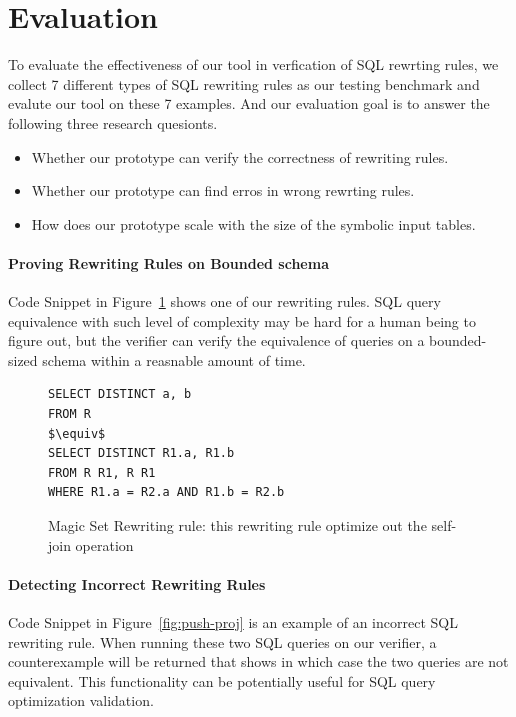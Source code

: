 \section{Evaluation}
\label{sec:eval}
To evaluate the effectiveness of our tool in verfication of SQL rewrting rules, we collect 7 different types of SQL rewriting rules as our testing benchmark and evalute our tool on these 7 examples. And our evaluation goal is to answer the following three research quesionts.
\begin{itemize}\itemsep0pt
\item Whether our prototype can verify the correctness of rewriting rules.
\item Whether our prototype can find erros in wrong rewrting rules.
\item How does our prototype scale with the size of the symbolic input tables.
\end{itemize}

\paragraph{Proving Rewriting Rules on Bounded schema}
Code Snippet in Figure~\ref{fig:magic} shows one of our rewriting rules. 
SQL query equivalence with such level of complexity may be hard for a human being to 
figure out, but the verifier can verify the equivalence of queries on a bounded-sized 
schema within a reasnable amount of time.

\begin{figure}[!htb]
\begin{lstlisting}[style=sql,xleftmargin=.3\textwidth,mathescape=true]
SELECT DISTINCT a, b
FROM R
$\equiv$
SELECT DISTINCT R1.a, R1.b
FROM R R1, R R1
WHERE R1.a = R2.a AND R1.b = R2.b
\end{lstlisting}
\caption{Magic Set Rewriting rule: this rewriting rule optimize out the self-join operation}
\label{fig:magic}
\end{figure}

\paragraph{Detecting Incorrect Rewriting Rules}
Code Snippet in Figure~\ref{fig:push-proj} is an example 
of an incorrect SQL rewriting rule.
When running these two SQL queries on our verifier, a counterexample will be returned that
shows in which case the two queries are not equivalent.
This functionality can be potentially useful for SQL query optimization validation.


